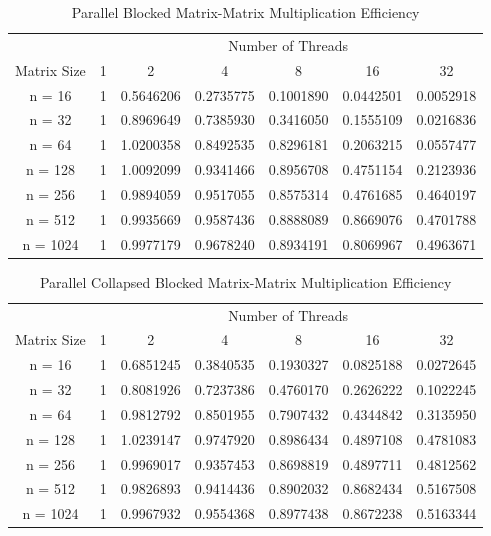 \documentclass{article}
\begin{document}
\begin{table}[ht!]
    \caption{Parallel Blocked Matrix-Matrix Multiplication Efficiency}
    \centering
    \begin{tabular}{|c|c|c|c|c|c|c|}
        \hline
        \multicolumn{1}{|c|}{} & \multicolumn{6}{c|}{Number of Threads} \\
        \cline{2-7}
        \multicolumn{1}{|c|}{Matrix Size} & 1 & 2 & 4 & 8 & 16 & 32 \\
        \hline
        n = 16 & 1 & 0.5646206 & 0.2735775 & 0.1001890 & 0.0442501 & 0.0052918 \\
        \hline
        n = 32 & 1 & 0.8969649 & 0.7385930 & 0.3416050 & 0.1555109 & 0.0216836 \\
        \hline
        n = 64 & 1 & 1.0200358 & 0.8492535 & 0.8296181 & 0.2063215 & 0.0557477 \\
        \hline
        n = 128 & 1 & 1.0092099 & 0.9341466 & 0.8956708 & 0.4751154 & 0.2123936 \\
        \hline
        n = 256 & 1 & 0.9894059 & 0.9517055 & 0.8575314 & 0.4761685 & 0.4640197 \\
        \hline
        n = 512 & 1 & 0.9935669 & 0.9587436 & 0.8888089 & 0.8669076 & 0.4701788 \\
        \hline
        n = 1024 & 1 & 0.9977179 & 0.9678240 & 0.8934191 & 0.8069967 & 0.4963671 \\
        \hline
    \end{tabular}
\end{table}

\clearpage

\begin{table}[ht!]
    \caption{Parallel Collapsed Blocked Matrix-Matrix Multiplication Efficiency}
    \centering
    \begin{tabular}{|c|c|c|c|c|c|c|}
        \hline
        \multicolumn{1}{|c|}{} & \multicolumn{6}{c|}{Number of Threads} \\
        \cline{2-7}
        \multicolumn{1}{|c|}{Matrix Size} & 1 & 2 & 4 & 8 & 16 & 32 \\
        \hline
        n = 16 & 1 & 0.6851245 & 0.3840535 & 0.1930327 & 0.0825188 & 0.0272645 \\
        \hline
        n = 32 & 1 & 0.8081926 & 0.7237386 & 0.4760170 & 0.2626222 & 0.1022245 \\
        \hline
        n = 64 & 1 & 0.9812792 & 0.8501955 & 0.7907432 & 0.4344842 & 0.3135950 \\
        \hline
        n = 128 & 1 & 1.0239147 & 0.9747920 & 0.8986434 & 0.4897108 & 0.4781083 \\
        \hline
        n = 256 & 1 & 0.9969017 & 0.9357453 & 0.8698819 & 0.4897711 & 0.4812562 \\
        \hline
        n = 512 & 1 & 0.9826893 & 0.9414436 & 0.8902032 & 0.8682434 & 0.5167508 \\
        \hline
        n = 1024 & 1 & 0.9967932 & 0.9554368 & 0.8977438 & 0.8672238 & 0.5163344 \\
        \hline
    \end{tabular}
\end{table}
\end{document}
